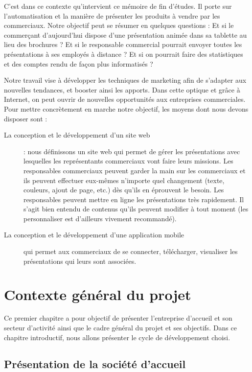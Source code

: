 \documentclass[12pt, ChapStyle1, oneside]{./Styles/Dea_Gsm}
\begin{document}
C’est dans ce contexte qu’intervient ce mémoire de fin d’études. Il porte sur l’automatisation et la manière de présenter les produits à vendre par les commerciaux. Notre objectif peut se résumer en quelques questions : Et si le commerçant d’aujourd’hui dispose d’une présentation animée dans sa tablette au lieu des brochures ? Et si le responsable commercial pourrait envoyer toutes les présentations à ses employés à distance ? Et si on pourrait faire des statistiques et des comptes rendu de façon plus informatisés ?


Notre travail vise à développer les techniques de marketing afin de s’adapter aux nouvelles tendances, et booster ainsi les apports. Dans cette optique et grâce à Internet, on peut ouvrir de nouvelles opportunités aux entreprises commerciales. Pour mettre concrètement en marche notre objectif, les moyens dont nous devons disposer sont :

\begin{description}
\item[La conception et le développement d’un site web] : nous définissons un site web qui permet de gérer les présentations avec lesquelles les représentants commerciaux vont faire leurs missions. Les responsables commerciaux peuvent garder la main sur les commerciaux et ils peuvent effectuer eux-mêmes n’importe quel changement (texte, couleurs, ajout de page, etc.) dès qu’ils en éprouvent le besoin. Les responsables peuvent mettre en ligne les présentations très rapidement. Il s’agit bien entendu de contenus qu’ils peuvent modifier à tout moment (les personnaliser est d’ailleurs vivement recommandé).
\item[La conception et le développement d’une application mobile] qui permet aux commerciaux de se connecter, télécharger, visualiser les présentations qui leurs sont associées.\end{description}


\chapter{Contexte général du projet}
\vspace*{3cm}

Ce premier chapitre a pour objectif de présenter l’entreprise d’accueil et son secteur d’activité ainsi que le cadre général du projet et ses objectifs. Dans ce chapitre introductif, nous allons présenter le cycle de développement choisi.
\pagebreak
\section{Présentation de la société d’accueil}
\end{document}
